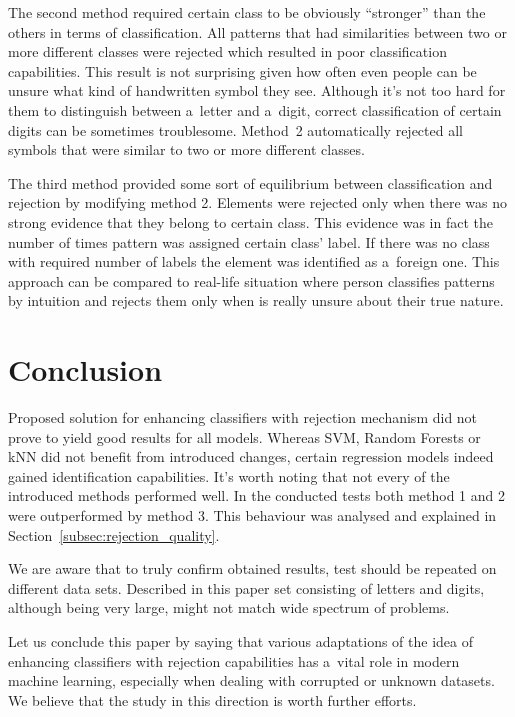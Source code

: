 \documentclass{llncs}
\begin{document}
The second method required certain class to be obviously ``stronger'' than the others in terms of classification. All patterns that had similarities between two or more different classes were rejected which resulted in poor classification capabilities. This result is not surprising given how often even people can be unsure what kind of handwritten symbol they see. Although it's not too hard for them to distinguish between a~letter and a~digit, correct classification of certain digits can be sometimes troublesome. Method~2 automatically rejected all symbols that were similar to two or more different classes. 

The third method provided some sort of equilibrium between classification and rejection by modifying method 2. Elements were rejected only when there was no strong evidence that they belong to certain class. This evidence was in fact the number of times pattern was assigned certain class' label. If there was no class with required number of labels the element was identified as a~foreign one. This approach can be compared to real-life situation where person classifies patterns by intuition and rejects them only when is really unsure about their true nature. 


\section{Conclusion}
  \label{sec:Conclusion}

Proposed solution for enhancing classifiers with rejection mechanism did not prove to yield good results for all models. Whereas SVM, Random Forests or kNN did not benefit from introduced changes, certain regression models indeed gained identification capabilities. It's worth noting that not every of the introduced methods performed well. In the conducted tests both method 1 and 2 were outperformed by method 3. This behaviour was analysed and explained in Section~\ref{subsec:rejection_quality}. 

We are aware that to truly confirm obtained results, test should be repeated on different data sets. Described in this paper set consisting of letters and digits, although being very large, might not match wide spectrum of problems. 

Let us conclude this paper by saying that various adaptations of the idea of enhancing classifiers with rejection capabilities has a~vital role in modern machine learning, especially when dealing with corrupted or unknown datasets. We believe that the study in this direction is worth further efforts.
\end{document}
